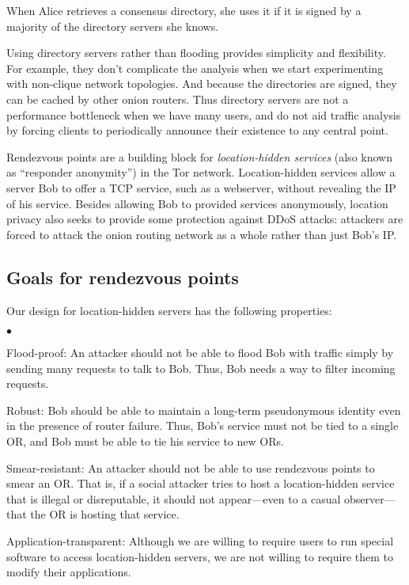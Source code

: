\documentclass[times,10pt,twocolumn]{article}
\newenvironment{tightlist}{\begin{list}{$\bullet$}{
  \setlength{\itemsep}{0mm}
    \setlength{\parsep}{0mm}
    }}{\end{list}}
\begin{document}
When Alice retrieves a consensus directory, she uses it if it
is signed by a majority of the directory servers she knows.

Using directory servers rather than flooding provides simplicity and
flexibility. For example, they don't complicate the analysis when we
start experimenting with non-clique network topologies. And because
the directories are signed, they can be cached by other onion routers.
Thus directory servers are not a performance
bottleneck when we have many users, and do not aid traffic analysis by
forcing clients to periodically announce their existence to any
central point.


\label{sec:rendezvous}

Rendezvous points are a building block for \emph{location-hidden
services} (also known as ``responder anonymity'') in the Tor
network.  Location-hidden services allow a server Bob to offer a TCP
service, such as a webserver, without revealing the IP of his service.
Besides allowing Bob to provided services anonymously, location
privacy also seeks to provide some protection against DDoS attacks:
attackers are forced to attack the onion routing network as a whole
rather than just Bob's IP.

\subsection{Goals for rendezvous points}
\label{subsec:rendezvous-goals}
Our design for location-hidden servers has the following properties:
\begin{tightlist}
\item[Flood-proof:] An attacker should not be able to flood Bob with traffic
  simply by sending many requests to talk to Bob.  Thus, Bob needs a
  way to filter incoming requests.
\item[Robust:] Bob should be able to maintain a long-term pseudonymous
  identity even in the presence of router failure.  Thus, Bob's service
  must not be tied to a single OR, and Bob must be able to tie his service
  to new ORs.
\item[Smear-resistant:] An attacker should not be able to use rendezvous
  points to smear an OR.  That is, if a social attacker tries to host a 
  location-hidden service that is illegal or disreputable, it should not
  appear---even to a casual observer---that the OR is hosting that service.
\item[Application-transparent:] Although we are willing to require users to
  run special software to access location-hidden servers, we are not willing
  to require them to modify their applications.
\end{tightlist}
\end{document}
